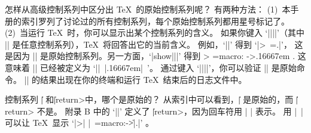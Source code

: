 \danger 怎样从高级控制系列中区分出 \TeX\ 的原始控制系列呢？
有两种方法：
(1)~本手册的索引罗列了讨论过的所有控制系列，每个原始控制系列都用星号标记了。
(2)~当运行 \TeX\ 时，你可以显示出某个控制系列的含义。
如果你键入 `|\show||\cs|'（其中 |\cs| 是任意控制系列），\TeX\ 将回答出它的当前含义。
例如，`|\show|' 得到 \hbox{`|> =.|'}，
这是因为 || 是原始控制系列。另一方面，`|show||\thinspace|' 得到
\begintt
> \thinspace=macro:
->\kern .16667em .
\endtt
这意味着 |\thinspace| 已经被定义为 `|\kern|~|.16667em|~'。
通过键入 `|\show||\kern|'，你可以验证 |\kern| 是原始命令。
|\show| 的结果出现在你的终端和运行 \TeX\ 结束后的日志文件中。

\dangerexercise 控制系列 |\|\] 和|\|\<return>中，哪个是原始的？
\answer 从索引中可以看到，|\|\] 是原始的，而 |\|\<return> 不是。
附录 B 中的 `|\def\^^M{\ }|' 定义了 |\|\<return>，因为回车符用 |^^M| 表示。
用 |\show\^^M| 可以让 \TeX\ 显示 `|>| |\^^M=macro:->\|\]|.|' 。

